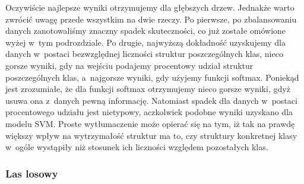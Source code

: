 Oczywiście najlepsze wyniki otrzymujemy dla głębszych drzew. Jednakże warto zwrócić uwagę przede wszystkim na dwie rzeczy. Po pierwsze, po zbalansowaniu danych zanotowaliśmy znaczny spadek skuteczności, co już zostałe omówione wyżej w~tym podrozdziale. Po drugie, najwyższą dokładność uzyskujemy dla danych w~postaci bezwzględnej liczności struktur poszczególnych klas, nieco gorsze wyniki, gdy na wejściu podajemy procentowy udział struktur poszczególnych klas, a~najgorsze wyniki, gdy użyjemy funkcji softmax. Poniekąd jest zrozumiałe, że dla funkcji softmax otrzymujemy nieco gorsze wyniki, gdyż usuwa ona z~danych pewną informację. Natomiast spadek dla danych w~postaci procentowego udziału jest nietypowy, aczkolwiek podobne wyniki uzyskano dla modelu SVM. Proste wytłumaczenie może opierać się na tym, iż tak na prawdę większy wpływ na wytrzymałość struktur ma to, czy struktury konkretnej klasy w~ogóle wystąpiły niż stosunek ich liczności względem pozostałych klas.

\subsubsection{Las losowy}
\label{structures.with.rfc}

